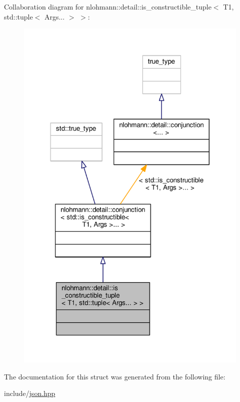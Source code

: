 Collaboration diagram for nlohmann\+:\+:detail\+:\+:is\+\_\+constructible\+\_\+tuple$<$ T1, std\+:\+:tuple$<$ Args... $>$ $>$\+:
\nopagebreak
\begin{figure}[H]
\begin{center}
\leavevmode
\includegraphics[width=318pt]{structnlohmann_1_1detail_1_1is__constructible__tuple_3_01T1_00_01std_1_1tuple_3_01Args_8_8_8_01_4_01_4__coll__graph}
\end{center}
\end{figure}


The documentation for this struct was generated from the following file\+:\begin{DoxyCompactItemize}
\item 
include/\hyperlink{json_8hpp}{json.\+hpp}\end{DoxyCompactItemize}
